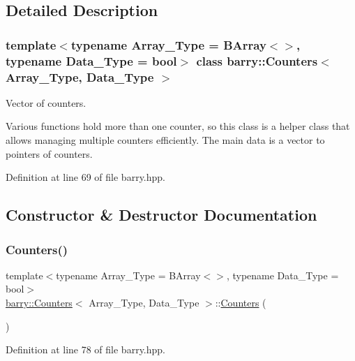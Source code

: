 \subsection{Detailed Description}
\subsubsection*{template$<$typename Array\+\_\+\+Type = B\+Array$<$$>$, typename Data\+\_\+\+Type = bool$>$\newline
class barry\+::\+Counters$<$ Array\+\_\+\+Type, Data\+\_\+\+Type $>$}

Vector of counters. 

Various functions hold more than one counter, so this class is a helper class that allows managing multiple counters efficiently. The main data is a vector to pointers of counters. 

Definition at line 69 of file barry.\+hpp.



\subsection{Constructor \& Destructor Documentation}
\mbox{\label{classbarry_1_1_counters_adebe3273f50b48637efe1b3e73e0dcc6}} 
\subsubsection{\texorpdfstring{Counters()}{Counters()}\hspace{0.1cm}{\footnotesize\ttfamily [1/2]}}
{\footnotesize\ttfamily template$<$typename Array\+\_\+\+Type = B\+Array$<$$>$, typename Data\+\_\+\+Type = bool$>$ \\
\hyperlink{classbarry_1_1_counters}{barry\+::\+Counters}$<$ Array\+\_\+\+Type, Data\+\_\+\+Type $>$\+::\hyperlink{classbarry_1_1_counters}{Counters} (\begin{DoxyParamCaption}{ }\end{DoxyParamCaption})\hspace{0.3cm}{\ttfamily [inline]}}



Definition at line 78 of file barry.\+hpp.

\mbox{\label{classbarry_1_1_counters_acc54ef822eea4170573142ecb189318d}} 
